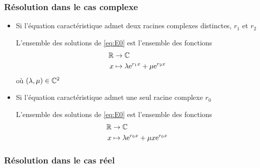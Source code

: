 \subsubsection{Résolution dans le cas complexe}

\begin{thm}
\begin{itemize}
    \item Si l'équation caractéristique admet deux racines complexes
        distinctes, $r_1$ et $r_2$

        L'ensemble des solutions de \eqref{eq:E0} est l'ensemble des
        fonctions
        \begin{align*}
            \mathbb{R} &\to \mathbb{C} \\
            x &\mapsto \lambda \mathrm{e}^{r_1 x} + \mu \mathrm{e}^{r_2 x}
        \end{align*}
        où $(\lambda, \mu) \in \mathbb{C}^2$
    \item Si l'équation caractéristique admet une seul racine complexe
        $r_0$

        L'ensemble des solutions de \eqref{eq:E0} est l'ensemble des
        fonctions
        \begin{align*}
            \mathbb{R} &\to \mathbb{C} \\
            x &\mapsto \lambda \mathrm{e}^{r_0 x} + \mu x \mathrm{e}^{r_0 x}
        \end{align*}
\end{itemize}
\end{thm}

\subsubsection{Résolution dans le cas réel}


